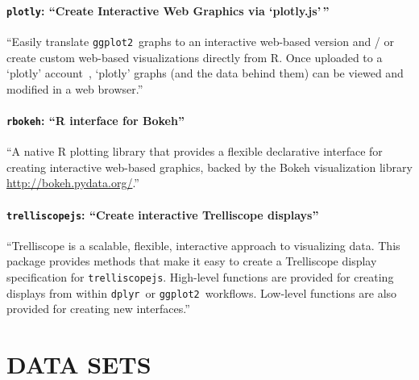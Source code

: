 \documentclass[stat,dissertation]{puthesis}\usepackage[]{graphicx}\usepackage{xcolor}
\newcommand{\pkg}[1]{\texttt{#1}}
\newcommand{\ggplot}{\pkg{ggplot2}}
\newcommand{\trelliscopejs}{\pkg{trelliscopejs}}
\begin{document}
\subsubsection{\pkg{plotly}: ``Create Interactive Web Graphics via `plotly.js'\,''}

``Easily translate \ggplot~graphs to an interactive web-based version and / or create custom web-based visualizations directly from R. Once uploaded to a `plotly' account~\cite{plotly}, `plotly' graphs (and the data behind them) can be viewed and modified in a web browser.''~\cite{r_plotly}~\cite{github_plotly}


\subsubsection{\pkg{rbokeh}: ``R interface for Bokeh''}

``A native R plotting library that provides a flexible declarative interface for creating interactive web-based graphics, backed by the Bokeh visualization library \url{http://bokeh.pydata.org/}.''~\cite{r_bokeh}~\cite{github_bokeh}


\subsubsection{\trelliscopejs: ``Create interactive Trelliscope displays''}

``Trelliscope is a scalable, flexible, interactive approach to visualizing data. This package provides methods that make it easy to create a Trelliscope display specification for \trelliscopejs. High-level functions are provided for creating displays from within \pkg{dplyr}~or \ggplot~workflows. Low-level functions are also provided for creating new interfaces.''~\cite{github_trelliscopejs}



%
\chapter{DATA SETS}
\end{document}

